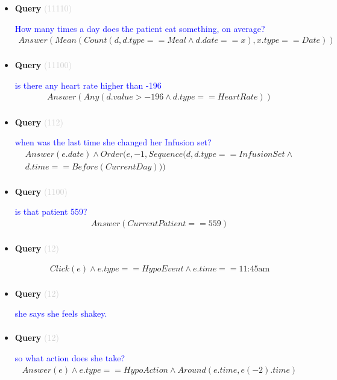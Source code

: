 \documentclass[11pt]{article}
\newcommand{\key}[1]{\textcolor{lightgray}{#1}}
\newcounter{CQuery}
\begin{document}
\begin{itemize}
\item
\textbf{Query\theCQuery} \key{(11110)} \addtocounter{CQuery}{1}
\textcolor{blue}{ How many times a day does the patient eat something, on average? }
\begin{multline*}
Answer(Mean(Count(d, d.type==Meal \wedge d.date==x), x.type==Date)) \\ 
\end{multline*}


\item
\textbf{Query\theCQuery} \key{(11100)} \addtocounter{CQuery}{1}
\textcolor{blue}{ is there any heart rate higher than -196 }
\begin{multline*}
Answer(Any(d.value>-196 \wedge d.type==HeartRate)) \\ 
\end{multline*}


\item
\textbf{Query\theCQuery} \key{(112)} \addtocounter{CQuery}{1}
\textcolor{blue}{ when was the last time she changed her Infusion set? }
\begin{multline*}
Answer(e.date) \wedge Order(e, -1, Sequence(d, d.type==InfusionSet\wedge \\ 
d.time==Before(CurrentDay))) \\ 
\end{multline*}


\item
\textbf{Query\theCQuery} \key{(1100)} \addtocounter{CQuery}{1}
\textcolor{blue}{ is that patient 559? }
\begin{multline*}
Answer(CurrentPatient==559) \\ 
\end{multline*}


\item
\textbf{Query\theCQuery} \key{(12)} \addtocounter{CQuery}{1}
\textcolor{blue}{  }
\begin{multline*}
Click(e) \wedge e.type == HypoEvent \wedge e.time == \mbox{11:45am} \\ 
\end{multline*}


\item
\textbf{Query\theCQuery} \key{(12)} \addtocounter{CQuery}{1}
\textcolor{blue}{ she says she feels shakey. }
\begin{multline*}
\end{multline*}


\item
\textbf{Query\theCQuery} \key{(12)} \addtocounter{CQuery}{1}
\textcolor{blue}{ so what action does she take? }
\begin{multline*}
Answer(e) \wedge e.type == HypoAction \wedge Around(e.time, e(-2).time) \\ 
\end{multline*}



\end{itemize}
\end{document}
